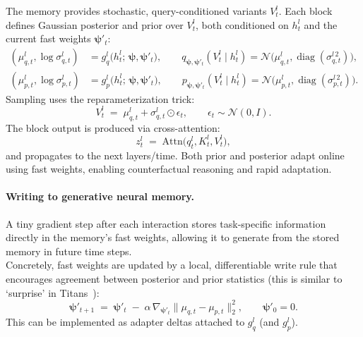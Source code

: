 The memory provides stochastic, query-conditioned variants \(V_t^l\).
Each block defines Gaussian posterior and prior over \( V_t^l \), both conditioned on \( h_t^l \) and the current fast weights \( \boldsymbol{\psi}'_t \):
\begin{align}
(\mu_{q,t}^l,\log\sigma_{q,t}^l) &= g_q^l\!\big(h_t^l;\,\boldsymbol{\psi},\boldsymbol{\psi}'_t\big), \qquad
q_{\boldsymbol{\psi},\boldsymbol{\psi}'_t}(V_t^l\mid h_t^l) = \mathcal{N}\!\big(\mu_{q,t}^l,\operatorname{diag}(\sigma_{q,t}^{l\,2})\big), \\
(\mu_{p,t}^l,\log\sigma_{p,t}^l) &= g_p^l\!\big(h_t^l;\,\boldsymbol{\psi},\boldsymbol{\psi}'_t\big), \qquad
p_{\boldsymbol{\psi},\boldsymbol{\psi}'_t}(V_t^l\mid h_t^l) = \mathcal{N}\!\big(\mu_{p,t}^l,\operatorname{diag}(\sigma_{p,t}^{l\,2})\big).
\end{align}
Sampling uses the reparameterization trick:
\begin{equation}
V_t^l \;=\; \mu_{q,t}^l + \sigma_{q,t}^l \odot \epsilon_t, \qquad \epsilon_t \sim \mathcal{N}(0,I).
\end{equation}
The block output is produced via cross-attention:
\begin{equation}
z_t^l \;=\; \mathrm{Attn}\!\big(q_t^l, K_t^l, V_t^l\big),
\end{equation}
and propagates to the next layers/time. Both prior and posterior adapt online using fast weights, enabling counterfactual reasoning and rapid adaptation.

\vspace{0.75ex}
\paragraph{Writing to generative neural memory.}
A tiny gradient step after each interaction stores task-specific information directly in the memory's fast weights, allowing it to generate from the stored memory in future time steps.
\\
Concretely, fast weights are updated by a local, differentiable write rule that encourages agreement between posterior and prior statistics (this is similar to `surprise' in Titans~\cite{behrouz2024titans}):
\begin{equation}
\boldsymbol{\psi}'_{t+1}
\;=\;
\boldsymbol{\psi}'_t
\;-\;
\alpha\,\nabla_{\boldsymbol{\psi}'_t}
\Big\| \mu_{q,t} - \mu_{p,t} \Big\|_2^2,
\qquad
\boldsymbol{\psi}'_0 = 0.
\end{equation}
This can be implemented as adapter deltas attached to \( g_q^l \) (and \( g_p^l \)).

